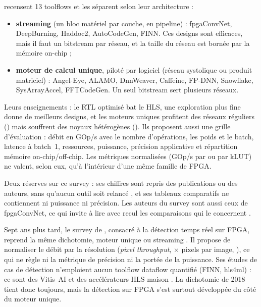 \citet{2018-venieris-toolflows-mapping-convolutional-neural-networks} recensent 13 toolflows
et les séparent selon leur architecture  :
\begin{itemize}
  \item \textbf{streaming} (un bloc matériel par couche, en pipeline) : fpgaConvNet,
    DeepBurning, Haddoc2, AutoCodeGen, FINN. Ces designs sont efficaces, mais il faut un
    bitstream par réseau, et la taille du réseau est bornée par la mémoire on-chip ;
  \item \textbf{moteur de calcul unique}, piloté par logiciel (réseau systolique ou produit
    matriciel) : Angel-Eye, ALAMO, DnnWeaver, Caffeine, FP-DNN, Snowflake, SysArrayAccel,
    FFTCodeGen. Un seul bitstream sert plusieurs réseaux.
\end{itemize}
Leurs enseignements  : le RTL optimisé bat le HLS, une exploration plus fine
donne de meilleurs designs, et les moteurs uniques profitent des réseaux réguliers ()
mais souffrent des noyaux hétérogènes (). Ils proposent aussi une grille
d'évaluation  : débit en GOp/s avec le nombre d'opérations, les poids et le
batch, latence à batch~1, ressources, puissance, précision applicative et répartition
mémoire on-chip/off-chip. Les métriques normalisées (GOp/s par  ou par kLUT) ne valent,
selon eux, qu'à l'intérieur d'une même famille de FPGA.

Deux réserves sur ce survey : ses chiffres sont repris des publications ou des auteurs,
sans qu'aucun outil soit relancé , et ses tableaux comparatifs ne contiennent ni
puissance ni précision. Les auteurs du survey sont aussi ceux de fpgaConvNet, ce qui invite
à lire avec recul les comparaisons qui le concernent \deduit.

Sept ans plus tard, le survey de \citet{2025-hozhabr-survey-real-time-object-detection},
consacré à la détection temps réel sur FPGA, reprend la même dichotomie, moteur unique ou
streaming . Il propose de normaliser le débit par la résolution (\emph{pixel
throughput},  $\times$ pixels par image, ), ce qui ne règle ni la
métrique de précision ni la portée de la puissance. Ses études de cas de détection
n'emploient aucun toolflow dataflow quantifié (FINN, hls4ml) : ce sont des  Vitis~AI et
des accélérateurs HLS maison . La dichotomie de 2018 tient donc toujours, mais
la détection sur FPGA s'est surtout développée du côté du moteur unique.

